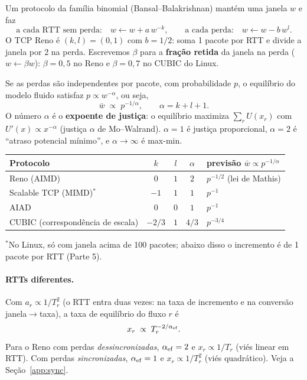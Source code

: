 \documentclass[11pt,a4paper]{article}
\begin{document}
Um protocolo da família binomial (Bansal--Balakrishnan) mantém uma janela $w$ e faz
\begin{equation}
\text{a cada RTT sem perda:}\quad w\leftarrow w+a\,w^{-k},
\qquad
\text{a cada perda:}\quad w\leftarrow w-b\,w^{l}.
\label{eq:binomialA}
\end{equation}
O TCP Reno é $(k,l)=(0,1)$ com $b=1/2$: soma 1 pacote por RTT e divide a janela por
2 na perda. Escrevemos $\beta$ para a \textbf{fração retida} da janela na perda
($w\leftarrow\beta w$): $\beta=0{,}5$ no Reno e $\beta=0{,}7$ no CUBIC do Linux.

Se as perdas são independentes por pacote, com probabilidade $p$, o equilíbrio do
modelo fluido satisfaz $p\propto w^{-\alpha}$, ou seja,
\begin{equation}
\bar w\;\propto\;p^{-1/\alpha},\qquad \alpha=k+l+1 .
\label{eq:alphaA}
\end{equation}
O número $\alpha$ é o \textbf{expoente de justiça}: o equilíbrio maximiza
$\sum_r U(x_r)$ com $U'(x)\propto x^{-\alpha}$ (justiça $\alpha$ de Mo--Walrand).
$\alpha=1$ é justiça proporcional, $\alpha=2$ é “atraso potencial mínimo”, e
$\alpha\to\infty$ é max-min.

\begin{center}
\begin{tabular}{@{}lcccl@{}}
\toprule
Protocolo & $k$ & $l$ & $\alpha$ & previsão $\bar w\propto p^{-1/\alpha}$\\
\midrule
Reno (AIMD) & $0$ & $1$ & $2$ & $p^{-1/2}$ (lei de Mathis)\\
Scalable TCP (MIMD)$^{*}$ & $-1$ & $1$ & $1$ & $p^{-1}$\\
AIAD & $0$ & $0$ & $1$ & $p^{-1}$\\
CUBIC (correspondência de escala) & $-2/3$ & $1$ & $4/3$ & $p^{-3/4}$\\
\bottomrule
\end{tabular}

\smallskip
{\footnotesize $^{*}$No Linux, só com janela acima de 100 pacotes; abaixo disso o
incremento é de 1 pacote por RTT (Parte 5).}
\end{center}

\paragraph{RTTs diferentes.} Com $a_r\propto1/T_r^2$ (o RTT entra duas vezes: na
taxa de incremento e na conversão janela$\to$taxa), a taxa de equilíbrio do fluxo $r$ é
\begin{equation}
x_r\;\propto\;T_r^{-2/\alpha_{\rm ef}} .
\label{eq:rttbiasA}
\end{equation}
Para o Reno com perdas \emph{dessincronizadas}, $\alpha_{\rm ef}=2$ e $x_r\propto1/T_r$
(viés linear em RTT). Com perdas \emph{sincronizadas}, $\alpha_{\rm ef}=1$ e
$x_r\propto1/T_r^2$ (viés quadrático). Veja a Seção~\ref{app:sync}.
\end{document}
